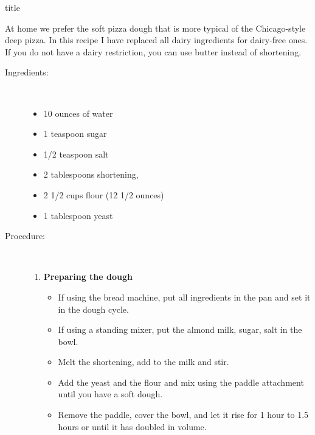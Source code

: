 \documentclass [11pt, letterpaper] {article}
\begin{document}
 {title}

At home we prefer the soft pizza dough that is more typical of the Chicago-style deep pizza. In this recipe I have replaced all dairy ingredients for dairy-free ones. If you do not have a dairy restriction, you can use  butter instead of shortening.

\vspace{0.3in}

\begin{description}

\item[Ingredients:]\ \\
	\begin{itemize}
	\item 10 ounces of water 
	\item 1 teaspoon sugar
	\item 1/2 teaspoon salt
	\item 2 tablespoons shortening,
	\item 2 1/2 cups flour  (12 1/2 ounces)
	\item 1 tablespoon yeast
	\end{itemize}

\item[Procedure:]\ \\

	\begin{enumerate}
	\item {\bf Preparing the dough}
	\begin{itemize}
	\item If using the bread machine, put all ingredients in the pan and set it in the dough cycle.
	\item If using a standing mixer, put the almond milk, sugar, salt in the bowl.
	\item Melt the shortening, add to the milk and stir.
	\item Add the yeast and the flour and mix using the paddle attachment until you have a soft dough.
	\item Remove the paddle, cover the bowl, and let it rise for 1 hour to 1.5 hours or until it has doubled in volume.
	\end{itemize}
	

\end{enumerate}
\end{description}
\end{document}
